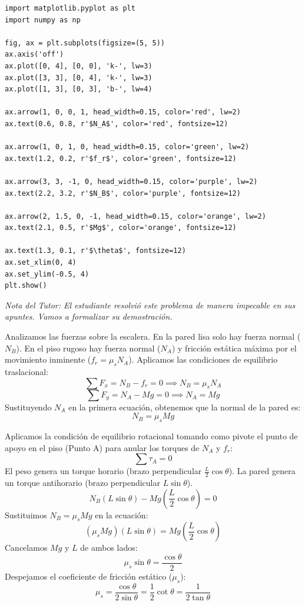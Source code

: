 \documentclass[12pt, a4paper]{article}
\begin{document}
\begin{verbatim}
import matplotlib.pyplot as plt
import numpy as np

fig, ax = plt.subplots(figsize=(5, 5))
ax.axis('off')
ax.plot([0, 4], [0, 0], 'k-', lw=3)
ax.plot([3, 3], [0, 4], 'k-', lw=3)
ax.plot([1, 3], [0, 3], 'b-', lw=4)

ax.arrow(1, 0, 0, 1, head_width=0.15, color='red', lw=2)
ax.text(0.6, 0.8, r'$N_A$', color='red', fontsize=12)

ax.arrow(1, 0, 1, 0, head_width=0.15, color='green', lw=2)
ax.text(1.2, 0.2, r'$f_r$', color='green', fontsize=12)

ax.arrow(3, 3, -1, 0, head_width=0.15, color='purple', lw=2)
ax.text(2.2, 3.2, r'$N_B$', color='purple', fontsize=12)

ax.arrow(2, 1.5, 0, -1, head_width=0.15, color='orange', lw=2)
ax.text(2.1, 0.5, r'$Mg$', color='orange', fontsize=12)

ax.text(1.3, 0.1, r'$\theta$', fontsize=12)
ax.set_xlim(0, 4)
ax.set_ylim(-0.5, 4)
plt.show()
\end{verbatim}

\textit{Nota del Tutor: El estudiante resolvió este problema de manera impecable en sus apuntes. Vamos a formalizar su demostración.}

Analizamos las fuerzas sobre la escalera. En la pared lisa solo hay fuerza normal ($N_B$). En el piso rugoso hay fuerza normal ($N_A$) y fricción estática máxima por el movimiento inminente ($f_r = \mu_s N_A$).
Aplicamos las condiciones de equilibrio traslacional:
$$ \sum F_x = N_B - f_r = 0 \implies N_B = \mu_s N_A $$
$$ \sum F_y = N_A - Mg = 0 \implies N_A = Mg $$
Sustituyendo $N_A$ en la primera ecuación, obtenemos que la normal de la pared es:
$$ N_B = \mu_s Mg $$

Aplicamos la condición de equilibrio rotacional tomando como pivote el punto de apoyo en el piso (Punto A) para anular los torques de $N_A$ y $f_r$:
$$ \sum \tau_A = 0 $$
El peso genera un torque horario (brazo perpendicular $\frac{L}{2}\cos\theta$). La pared genera un torque antihorario (brazo perpendicular $L\sin\theta$).
$$ N_B(L\sin\theta) - Mg\left(\frac{L}{2}\cos\theta\right) = 0 $$
Sustituimos $N_B = \mu_s Mg$ en la ecuación:
$$ (\mu_s Mg)(L\sin\theta) = Mg\left(\frac{L}{2}\cos\theta\right) $$
Cancelamos $Mg$ y $L$ de ambos lados:
$$ \mu_s \sin\theta = \frac{\cos\theta}{2} $$
Despejamos el coeficiente de fricción estático ($\mu_s$):
$$ \mu_s = \frac{\cos\theta}{2\sin\theta} = \frac{1}{2}\cot\theta = \frac{1}{2\tan\theta} $$
\end{document}
